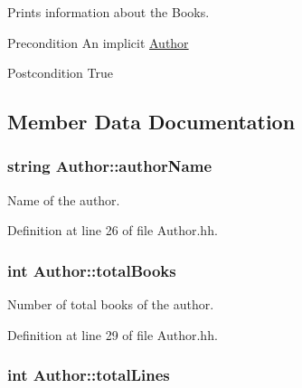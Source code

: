 Prints information about the Books. 

\begin{DoxyPrecond}{Precondition}
An implicit \hyperlink{class_author}{Author} 
\end{DoxyPrecond}
\begin{DoxyPostcond}{Postcondition}
True 
\end{DoxyPostcond}


\subsection{Member Data Documentation}
\hypertarget{class_author_a146b76b89d701097c36fb5d29df27bc4}{
\subsubsection[{author\-Name}]{\setlength{\rightskip}{0pt plus 5cm}string Author\-::author\-Name\hspace{0.3cm}{\ttfamily [private]}}}\label{class_author_a146b76b89d701097c36fb5d29df27bc4}


Name of the author. 



Definition at line 26 of file Author.\-hh.

\hypertarget{class_author_ac870b8c861aa0f69cd2c4e7b8d414902}{
\subsubsection[{total\-Books}]{\setlength{\rightskip}{0pt plus 5cm}int Author\-::total\-Books\hspace{0.3cm}{\ttfamily [private]}}}\label{class_author_ac870b8c861aa0f69cd2c4e7b8d414902}


Number of total books of the author. 



Definition at line 29 of file Author.\-hh.

\hypertarget{class_author_a8d818414bbd909287641b388601bf61a}{
\subsubsection[{total\-Lines}]{\setlength{\rightskip}{0pt plus 5cm}int Author\-::total\-Lines\hspace{0.3cm}{\ttfamily [private]}}}\label{class_author_a8d818414bbd909287641b388601bf61a}


